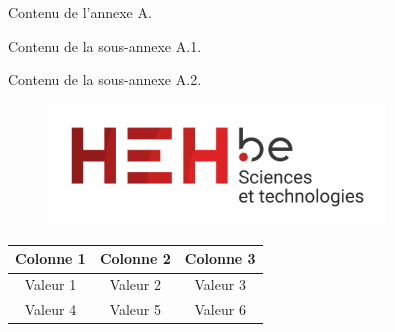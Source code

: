 Contenu de l'annexe A.

Contenu de la sous-annexe A.1.

Contenu de la sous-annexe A.2.

\begin{figure}[h!]
    \centering
    \includegraphics[width=0.8\textwidth]{img/logo_hehbe_tech.png}
    \label{fig:example_annexe}
\end{figure}

\begin{table}[h!]
    \centering
    \begin{tabular}{|c|c|c|}
        \hline
        Colonne 1 & Colonne 2 & Colonne 3 \\ \hline
        Valeur 1  & Valeur 2  & Valeur 3  \\ \hline
        Valeur 4  & Valeur 5  & Valeur 6  \\ \hline
    \end{tabular}
    \label{tab:example_annexe}
\end{table}